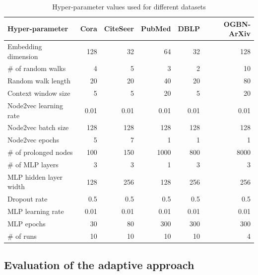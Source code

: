 \begin{table}
  \caption{Hyper-parameter values used for different datasets}
  \label{tab:hyperparameter-values}
  \begin{tabular}{lrrrrr}
    \toprule
    Hyper-parameter        & Cora & CiteSeer & PubMed & DBLP & OGBN-ArXiv \\
    \midrule
    Embedding dimension    & 128  & 32       & 64     & 32   & 128        \\
    \# of random walks     & 4    & 5        & 3      & 2    & 10         \\
    Random walk length     & 20   & 20       & 40     & 20   & 80         \\
    Context window size    & 5    & 5        & 20     & 5    & 20         \\
    Node2vec learning rate & 0.01 & 0.01     & 0.01   & 0.01 & 0.01       \\
    Node2vec batch size    & 128  & 128      & 128    & 128  & 128        \\
    Node2vec epochs        & 5    & 7        & 1      & 1    & 1          \\
    \# of prolonged nodes  & 100  & 150      & 1000   & 800  & 8000       \\
    \# of MLP layers       & 3    & 3        & 1      & 3    & 3          \\
    MLP hidden layer width & 128  & 256      & 128    & 256  & 256        \\
    Dropout rate           & 0.5  & 0.5      & 0.5    & 0.5  & 0.5        \\
    MLP learning rate      & 0.01 & 0.01     & 0.01   & 0.01 & 0.01       \\
    MLP epochs             & 30   & 80       & 300    & 300  & 300        \\
    \# of runs             & 10   & 10       & 10     & 10   & 4          \\
    \bottomrule
  \end{tabular}
\end{table}

\subsection{Evaluation of the adaptive approach}

